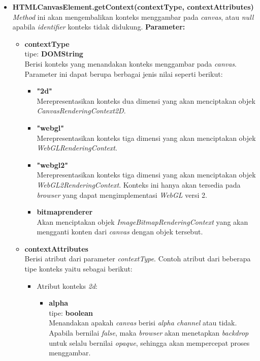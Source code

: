 \documentclass[a4paper,twoside]{article}
\begin{document}
\begin{enumerate}
\begin{enumerate}
			\begin{itemize}
				\item \textbf{HTMLCanvasElement.getContext(contextType, contextAttributes)} \\
				\textit{Method} ini akan mengembalikan konteks menggambar pada \textit{canvas}, atau \textit{null} apabila \textit{identifier} konteks tidak didukung.
				\textbf{Parameter:} 
				\begin{itemize}
					\item \textbf{contextType} \\tipe: \textbf{DOMString} \\ Berisi konteks yang menandakan konteks menggambar pada \textit{canvas}. Parameter ini dapat berupa berbagai jenis nilai seperti berikut:
					\begin{itemize}
						\item \textbf{"2d"} \\ Merepresentasikan konteks dua dimensi yang akan menciptakan objek \textit{CanvasRenderingContext2D}.
						\item \textbf{"webgl"} \\ Merepresentasikan konteks tiga dimensi yang akan menciptakan objek \textit{WebGLRenderingContext}.
						\item \textbf{"webgl2"} \\ Merepresentasikan konteks tiga dimensi yang akan menciptakan objek \textit{WebGL2RenderingContext}. Konteks ini hanya akan tersedia pada \textit{browser} yang dapat mengimplementasi \textit{WebGL} versi 2.
						\item \textbf{bitmaprenderer} \\ Akan menciptakan objek \textit{ImageBitmapRenderingContext} yang akan mengganti konten dari \textit{canvas} dengan objek tersebut.
					\end{itemize}
					
					\item \textbf{contextAttributes} \\ Berisi atribut dari parameter \textit{contextType}. Contoh atribut dari beberapa tipe konteks yaitu sebagai berikut:
					\begin{itemize}
						\item Atribut konteks \textit{2d}:
						\begin{itemize}
							\item \textbf{alpha} \\tipe: \textbf{boolean} \\ Menandakan apakah \textit{canvas} berisi \textit{alpha channel} atau tidak. Apabila bernilai \textit{false}, maka \textit{browser} akan menetapkan \textit{backdrop} untuk selalu bernilai \textit{opaque}, sehingga akan mempercepat proses menggambar.
						\end{itemize}
						

\end{itemize}
\end{itemize}
\end{itemize}
\end{enumerate}
\end{enumerate}
\end{document}
